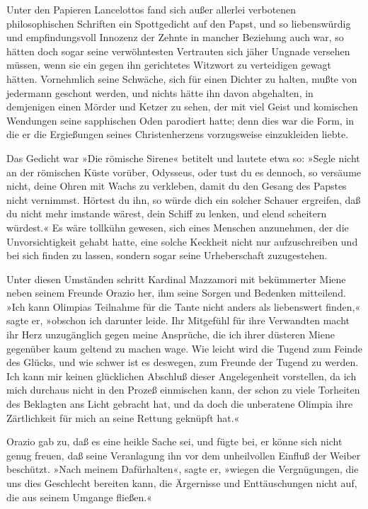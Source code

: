 Unter den Papieren Lancelottos fand sich außer allerlei verbotenen
philosophischen Schriften ein Spottgedicht auf den Papst, und so
liebenswürdig und empfindungsvoll Innozenz der Zehnte in mancher
Beziehung auch war, so hätten doch sogar seine verwöhntesten
Vertrauten sich jäher Ungnade versehen müssen, wenn sie ein gegen
ihn gerichtetes Witzwort zu verteidigen gewagt hätten. Vornehmlich
seine Schwäche, sich für einen Dichter zu halten, mußte von
jedermann geschont werden, und nichts hätte ihn davon abgehalten,
in demjenigen einen Mörder und Ketzer zu sehen, der mit viel Geist
\pagenum{[57]}und komischen Wendungen seine sapphischen Oden
parodiert hatte; denn dies war die Form, in die er die Ergießungen
seines Christenherzens vorzugsweise einzukleiden liebte.

Das Gedicht war »Die römische Sirene« betitelt und lautete etwa so:
»Segle nicht an der römischen Küste vorüber, Odysseus, oder tust du
es dennoch, so versäume nicht, deine Ohren mit Wachs zu verkleben,
damit du den Gesang des Papstes nicht vernimmst. Hörtest du ihn, so
würde dich ein solcher Schauer ergreifen, daß du nicht mehr
imstande wärest, dein Schiff zu lenken, und elend scheitern
würdest.« Es wäre tollkühn gewesen, sich eines Menschen anzunehmen,
der die Unvorsichtigkeit gehabt hatte, eine solche Keckheit nicht
nur aufzuschreiben und bei sich finden zu lassen, sondern sogar
seine Urheberschaft zuzugestehen.

Unter diesen Umständen schritt Kardinal Mazzamori mit bekümmerter
Miene neben seinem Freunde Orazio her, ihm seine Sorgen und
Bedenken mitteilend. »Ich kann Olimpias Teilnahme für die Tante
nicht anders als liebenswert finden,« sagte er, »obschon ich
darunter leide. Ihr Mitgefühl für ihre Verwandten macht ihr Herz
unzugänglich gegen meine Ansprüche, die ich ihrer düsteren Miene
gegenüber kaum geltend zu machen wage. Wie leicht wird die Tugend
zum Feinde des Glücks, und wie schwer ist es deswegen, zum Freunde
der Tugend zu werden. Ich kann mir keinen glücklichen Abschluß
dieser Angelegenheit vorstellen, da ich mich durchaus nicht in den
Prozeß einmischen kann, der schon zu viele Torheiten des Beklagten
ans Licht gebracht hat, und da doch die unberatene Olimpia ihre
Zärtlichkeit für mich an seine Rettung geknüpft hat.«

Orazio gab zu, daß es eine heikle Sache sei, und fügte bei, er
könne sich nicht genug freuen, daß seine Veranlagung ihn
\pagenum{[58]}vor dem unheilvollen Einfluß der Weiber beschützt.
»Nach meinem Dafürhalten«, sagte er, »wiegen die Vergnügungen, die
uns dies Geschlecht bereiten kann, die Ärgernisse und
Enttäuschungen nicht auf, die aus seinem Umgange fließen.«

